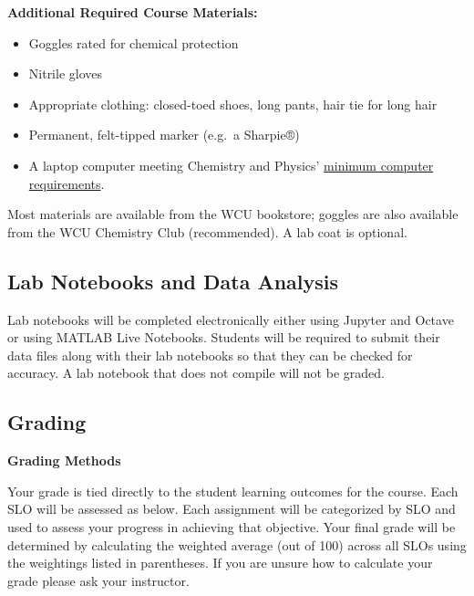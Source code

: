 \documentclass[]{tufte-book}
\providecommand{\tightlist}{%
  \setlength{\itemsep}{0pt}\setlength{\parskip}{0pt}}
\begin{document}
\textbf{Additional Required Course Materials:}

\begin{itemize}
\tightlist
\item
  Goggles rated for chemical protection
\item
  Nitrile gloves
\item
  Appropriate clothing: closed-toed shoes, long pants, hair tie for long hair
\item
  Permanent, felt-tipped marker (e.g.~a Sharpie®)
\item
  A laptop computer meeting Chemistry and Physics' \href{https://www.wcu.edu/learn/academic-services/it/computer-guidelines/index.aspx}{minimum computer requirements}.
\end{itemize}

Most materials are available from the WCU bookstore; goggles are also available from the WCU Chemistry Club (recommended). A lab coat is optional.

\hypertarget{lab-notebooks-and-data-analysis}{%
\subsection*{Lab Notebooks and Data Analysis}\label{lab-notebooks-and-data-analysis}}

Lab notebooks will be completed electronically either using Jupyter and Octave or using MATLAB Live Notebooks. Students will be required to submit their data files along with their lab notebooks so that they can be checked for accuracy. A lab notebook that does not compile will not be graded.

\hypertarget{grading}{%
\subsection*{Grading}\label{grading}}

\textbf{Grading Methods}

Your grade is tied directly to the student learning outcomes for the course. Each SLO will be assessed as below. Each assignment will be categorized by SLO and used to assess your progress in achieving that objective. Your final grade will be determined by calculating the weighted average (out of 100) across all SLOs using the weightings listed in parentheses. If you are unsure how to calculate your grade please ask your instructor.
\end{document}
